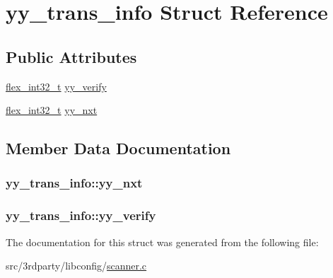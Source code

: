 \hypertarget{structyy__trans__info}{\section{yy\-\_\-trans\-\_\-info Struct Reference}
\label{structyy__trans__info}
}
\subsection*{Public Attributes}
\begin{DoxyCompactItemize}
\item 
\hyperlink{scanner_8c_a838ce943cf44ef7769480714fc6c3ba9}{flex\-\_\-int32\-\_\-t} \hyperlink{structyy__trans__info_a5c9f61e770deef50bd4e697310342fe9}{yy\-\_\-verify}
\item 
\hyperlink{scanner_8c_a838ce943cf44ef7769480714fc6c3ba9}{flex\-\_\-int32\-\_\-t} \hyperlink{structyy__trans__info_ae0715250c2bef261e596e77e0030f13e}{yy\-\_\-nxt}
\end{DoxyCompactItemize}


\subsection{Member Data Documentation}
\hypertarget{structyy__trans__info_ae0715250c2bef261e596e77e0030f13e}{
\subsubsection[{yy\-\_\-nxt}]{ yy\-\_\-trans\-\_\-info\-::yy\-\_\-nxt}}\label{structyy__trans__info_ae0715250c2bef261e596e77e0030f13e}
\hypertarget{structyy__trans__info_a5c9f61e770deef50bd4e697310342fe9}{
\subsubsection[{yy\-\_\-verify}]{ yy\-\_\-trans\-\_\-info\-::yy\-\_\-verify}}\label{structyy__trans__info_a5c9f61e770deef50bd4e697310342fe9}


The documentation for this struct was generated from the following file\-:\begin{DoxyCompactItemize}
\item 
src/3rdparty/libconfig/\hyperlink{scanner_8c}{scanner.\-c}\end{DoxyCompactItemize}
